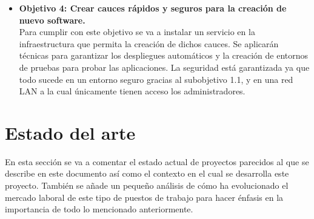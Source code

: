 \begin{text}
\begin{itemize}
		\item \textbf{Objetivo 4: Crear cauces rápidos y seguros para la creación de nuevo software.} \\
		Para cumplir con este objetivo se va a instalar un servicio en la infraestructura que permita la creación de dichos cauces. Se aplicarán técnicas para garantizar los despliegues automáticos y la creación de entornos de pruebas para probar las aplicaciones. La seguridad está garantizada ya que todo sucede en un entorno seguro gracias al subobjetivo 1.1, y en una red LAN a la cual únicamente tienen acceso los administradores.
	\end{itemize}
\end{text}
	
\section{Estado del arte}
	\begin{text}
		En esta sección se va a comentar el estado actual de proyectos parecidos al que se describe en este documento así como el contexto en el cual se desarrolla este proyecto. También se añade un pequeño análisis de cómo ha evolucionado el mercado laboral de este tipo de puestos de trabajo para hacer énfasis en la importancia de todo lo mencionado anteriormente.
	\end{text}

